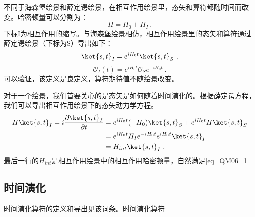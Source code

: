 \begin{definition}{}

不同于海森堡绘景和薛定谔绘景，在相互作用绘景里，态矢和算符都随时间而改变。哈密顿量可以分割为：
\begin{equation}
H=H_0+H_I~.
\end{equation}
下标I为相互作用的缩写。与海森堡绘景相仿，相互作用绘景里的态矢和算符通过薛定谔绘景（下标为S）导出如下：
\begin{equation}
\ket{s,t}_I=e^{iH_0 t}\ket{s,t}_S~,
\end{equation}
\begin{equation}\label{eq_QM06_1}
\mathcal O_I(t)=e^{iH_0 t}\mathcal O_Se^{-iH_0 t}~.
\end{equation}
可以验证，该定义是良定义，算符期待值不随绘景改变。
\end{definition}
对于一个绘景，我们首要关心的是态矢是如何随着时间演化的。根据薛定谔方程，我们可以导出相互作用绘景下的态矢动力学方程。
\begin{equation}
\begin{aligned}
H\ket{s,t}_I=i\frac{\partial\ket{s,t}_I}{\partial t}&= e^{iH_0 t}(-H_0)\ket{s,t}_S+e^{iH_0 t}H\ket{s,t}_S\\
&=e^{iH_0 t}H_Ie^{-iH_0 t}e^{iH_0 t}\ket{s,t}_I\\
&=H_{int}\ket{s,t}_I~.
\end{aligned}
\end{equation}
最后一行的$H_{int}$是相互作用绘景中的相互作用哈密顿量，自然满足\autoref{eq_QM06_1} 
\subsection{时间演化}
时间演化算符的定义和导出见该词条。\href{https://wuli.wiki/online/TOprt.html}{时间演化算符}


